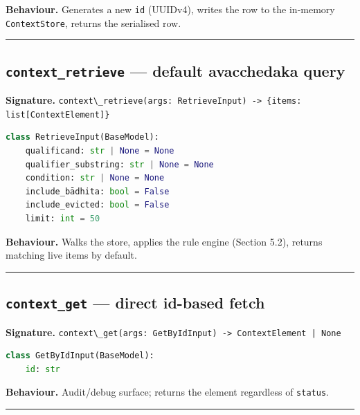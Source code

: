 \textbf{Behaviour.} Generates a new \passthrough{\lstinline!id!} (UUIDv4), writes the row to the in-memory \passthrough{\lstinline!ContextStore!}, returns the serialised row.

\begin{center}\rule{0.5\linewidth}{0.5pt}\end{center}

\subsection{\texorpdfstring{\texttt{context\_retrieve} --- default avacchedaka query}{context\_retrieve --- default avacchedaka query}}\label{context_retrieve-default-avacchedaka-query}

\textbf{Signature.} \passthrough{\lstinline!context\_retrieve(args: RetrieveInput) -> \{items: list[ContextElement]\}!}

\begin{lstlisting}[language=Python]
class RetrieveInput(BaseModel):
    qualificand: str | None = None
    qualifier_substring: str | None = None
    condition: str | None = None
    include_bādhita: bool = False
    include_evicted: bool = False
    limit: int = 50
\end{lstlisting}

\textbf{Behaviour.} Walks the store, applies the rule engine (Section 5.2), returns matching live items by default.

\begin{center}\rule{0.5\linewidth}{0.5pt}\end{center}

\subsection{\texorpdfstring{\texttt{context\_get} --- direct id-based fetch}{context\_get --- direct id-based fetch}}\label{context_get-direct-id-based-fetch}

\textbf{Signature.} \passthrough{\lstinline!context\_get(args: GetByIdInput) -> ContextElement | None!}

\begin{lstlisting}[language=Python]
class GetByIdInput(BaseModel):
    id: str
\end{lstlisting}

\textbf{Behaviour.} Audit/debug surface; returns the element regardless of \passthrough{\lstinline!status!}.

\begin{center}\rule{0.5\linewidth}{0.5pt}\end{center}

